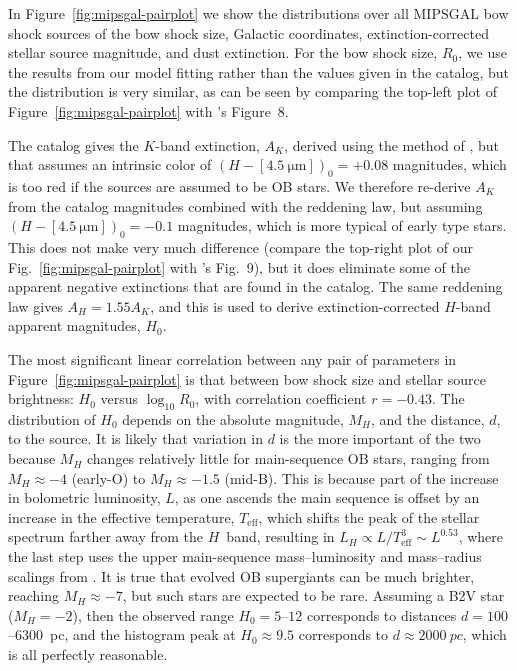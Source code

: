 In Figure~\ref{fig:mipsgal-pairplot} we show the distributions over
all MIPSGAL bow shock sources of the bow shock size, Galactic
coordinates, extinction-corrected stellar source magnitude, and dust
extinction.  For the bow shock size, \(R_0\), we use the results from
our model fitting rather than the values given in the
\citet{Kobulnicky:2016a} catalog, but the distribution is very
similar, as can be seen by comparing the top-left plot of
Figure~\ref{fig:mipsgal-pairplot} with \citeauthor{Kobulnicky:2016a}'s
Figure~8.

The catalog gives the \(K\)-band extinction, \(A_K\), derived using
the method of \citet{Majewski:2011a}, but that assumes an intrinsic
color of \((H - [\SI{4.5}{\um}])_0 = +0.08\) magnitudes, which is too
red if the sources are assumed to be OB stars.  We therefore re-derive
\(A_K\) from the catalog magnitudes combined with the
\citet{Indebetouw:2005a} reddening law, but assuming
\((H - [\SI{4.5}{\um}])_0 = -0.1\) magnitudes, which is more typical
of early type stars.  This does not make very much difference (compare
the top-right plot of our Fig.~\ref{fig:mipsgal-pairplot} with
\citeauthor{Kobulnicky:2016a}'s Fig.~9), but it does eliminate some of
the apparent negative extinctions that are found in the catalog.  The
same reddening law gives \(A_H = 1.55 A_K\), and this is used to
derive extinction-corrected \(H\)-band apparent magnitudes, \(H_0\).

The most significant linear correlation between any pair of parameters
in Figure~\ref{fig:mipsgal-pairplot} is that between bow shock size
and stellar source brightness: \(H_0\) versus \(\log_{10} R_0\), with
correlation coefficient \(r = -0.43\).  The distribution of \(H_0\)
depends on the absolute magnitude, \(M_H\), and the distance, \(d\),
to the source.  It is likely that variation in \(d\) is the more
important of the two because \(M_H\) changes relatively little for
main-sequence OB stars, ranging from \(M_H \approx -4\) (early-O) to
\(M_H \approx -1.5\) (mid-B).  This is because part of the increase in
bolometric luminosity, \(L\), as one ascends the main sequence is
offset by an increase in the effective temperature,
\(T_{\text{eff}}\), which shifts the peak of the stellar spectrum
farther away from the \(H\)~band, resulting in
\(L_H \propto L / T_{\text{eff}}^3 \sim L^{0.53}\), where the last step uses
the upper main-sequence mass--luminosity and mass--radius scalings from
\citet{Eker:2015a}. It is true that evolved OB supergiants can be much
brighter, reaching \(M_H \approx -7\), but such stars are expected to be
rare.  Assuming a B2V star (\(M_H = -2\)), then the observed range
\(H_0 = 5\)--\(12\) corresponds to distances
\(d = 100\)--\SI{6300}{pc}, and the histogram peak at
\(H_0 \approx 9.5\) corresponds to \(d \approx \SI{2000}{pc}\), which is all
perfectly reasonable.

